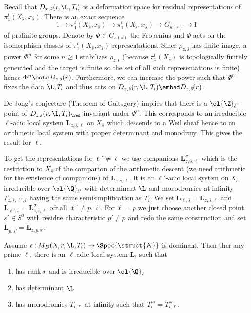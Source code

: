 \documentclass{article}
\newcommand{\Qbar}{\ol{\Q}}
\newcommand{\LL}{\mathbf{L}}
\begin{document}
Recall that $D_{x, \bar{s}}(r, \L, T_i)$ is a deformation space for residual representations of $\pi_1^t(X_{\bar{s}}, x_{\bar{s}})$. There is an exact sequence
\[ 1 \to \pi_1^t(X_{\bar{s}}, x_{\bar{s}}) \to \pi_1^t(X_s, x_s) \to G_{\kappa(s)} \to 1 \]
of profinite groups. Denote by $\Phi \in G_{\kappa(s)}$ the Frobenius and $\Phi$ acts on the isomorphism classes of $\pi_1^t(X_{\bar{s}}, x_{\bar{s}})$-representations. Since $\rho_{z, \bar{s}}$ has finite image, a power $\Phi^n$ for some $n \ge 1$ stabilizes $\rho_{z, \bar{s}}$ (because $\pi_1^t(X_{\bar{s}})$ is topologically finitely generated and the target is finite so the set of all such representations is finite) hence $\Phi^n \acts D_{z,\bar{s}}(r)$. Furthermore, we can increase the power such that $\Phi^n$ fixes the data $\L, T_i$ and thus acts on $D_{z, \bar{s}}(r, \L, T_i) \embed D_{z,\bar{s}}(r)$. 
\par 
De Jong's conjecture (Theorem of Gaitsgory) implies that there is a $\ol{\Z}_\ell$-point of $D_{z,\bar{s}}(r,\L, T_i)_\red$ invariant under $\Phi^n$. This corresponds to an irreducible $\ell$-adic local system $\LL_{z, \bar{s}, \ell}$ on $X_{\bar{s}}$ which descends to a Weil sheaf hence to an arithmetic \etale local system with proper determinant and monodrmy. This gives the result for $\ell$. 
\par 
To get the representations for $\ell' \neq \ell$ we use companions $\LL_{z, \bar{s}, \ell}^{\sigma}$ which is the restriction to $X_{\bar{s}}$ of the companion of the arithmetic descent (we need arithmetic for the existence of companions) of $\LL_{z, \bar{s}, \ell}$. It is an $\ell'$-adic local system on $X_{\bar{s}}$ irreducible over $\Qbar_{\ell'}$ with determinant $\L$ and monodromies at infinity $T_{z, \bar{s}, \ell',i}$ having the same semisimplification as $T_i$. We set $\LL_{\ell, \bar{s}} = \LL_{z,\bar{s}, \ell}$ and $\LL_{\ell', \bar{s}} = \LL_{z,\bar{s}, \ell}^\sigma$ ofr all $\ell' \neq p,\ell$. For $\ell = p$ we just choose another closed point $s' \in S^0$ with residue characteristic $p' \neq p$ and redo the same construction and set $\LL_{p, \bar{s'}} = \LL_{z, p, \bar{s}'}$. 

\begin{theorem}
Assume $\epsilon : M_B(X,r,\L, T_i) \to \Spec{\struct{K}}$ is dominant. Then ther any prime $\ell$, there is an $\ell$-adic local system $\LL_{\ell}$ such that
\begin{enumerate}
\item has rank $r$ and is irreducible over $\Qbar_\ell$
\item has determinant $\L$
\item has monodromies $T_{i,\ell}$ at infinity such that $T_i^{ss} = T_{i,\ell}^{ss}$.
\end{enumerate}
\end{theorem}  
\end{document}
